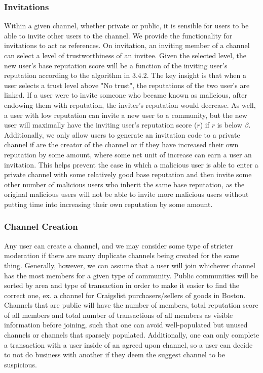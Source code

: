 \documentclass[letterpaper,twocolumn,10pt]{article}
\begin{document}
\subsubsection{Invitations}
Within a given channel, whether private or public, it is sensible for users to be able to invite other users to the channel. We provide the functionality for invitations to act as references. On invitation, an inviting member of a channel can select a level of trustworthiness of an invitee. Given the selected level, the new user's base reputation score will be a function of the inviting user's reputation according to the algorithm in $3.4.2$. The key insight is that when a user selects a trust level above "No trust", the reputations of the two user's are linked. If a user were to invite someone who became known as malicious, after endowing them with reputation, the inviter's reputation would decrease. As well, a user with low reputation can invite a new user to a community, but the new user will maximally have the inviting user's reputation score ($r$) if $r$ is below $\beta$. Additionally, we only allow users to generate an invitation code to a private channel if are the creator of the channel or if they have increased their own reputation by some amount, where some net unit of increase can earn a user an invitation. This helps prevent the case in which a malicious user is able to enter a private channel with some relatively good base reputation and then invite some other number of malicious users who inherit the same base reputation, as the original malicious users will not be able to invite more malicious users without putting time into increasing their own reputation by some amount. 

\subsubsection{Channel Creation}
Any user can create a channel, and we may consider some type of stricter moderation if there are many duplicate channels being created for the same thing. Generally, however, we can assume that a user will join whichever channel has the most members for a given type of community. Public communities will be sorted by area and type of transaction in order to make it easier to find the correct one, ex. a channel for Craigslist purchasers/sellers of goods in Boston. Channels that are public will have the number of members, total reputation score of all members and total number of transactions of all members as visible information before joining, such that one can avoid well-populated but unused channels or channels that sparsely populated. Additionally, one can only complete a transaction with a user inside of an agreed upon channel, so a user can decide to not do business with another if they deem the suggest channel to be suspicious.  
\end{document}
